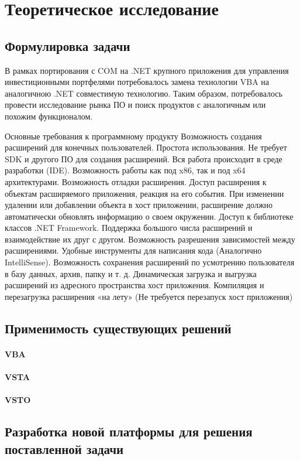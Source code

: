 \section{Теоретическое исследование}




\subsection{Формулировка задачи}

В рамках портирования с COM на .NET крупного приложения для управления инвестиционными портфелями потребовалось замена технологии VBA на аналогичною .NET совместимую технологию. Таким образом, потребовалось провести исследование рынка ПО и поиск продуктов с аналогичным или похожим функционалом.

Основные требования к программному продукту
Возможность создания расширений для конечных пользователей.
Простота использования.
Не требует SDK и другого ПО для создания расширений. Вся работа происходит в среде разработки (IDE).
Возможность работы как под x86, так и под x64 архитектурами.
Возможность отладки расширения.
Доступ расширения к объектам расширяемого приложения, реакция на его события.
При изменении удалении или добавлении объекта в хост приложении, расширение должно автоматически обновлять информацию о своем окружении.
Доступ к библиотеке классов .NET Framework.
Поддержка большого числа расширений и взаимодействие их друг с другом.
Возможность разрешения зависимостей между расширениями.
Удобные инструменты для написания кода (Аналогично IntelliSense).
Возможность сохранения расширений по усмотрению пользователя в базу данных, архив, папку и т. д.
Динамическая загрузка и выгрузка расширений из адресного пространства хост приложения.
Компиляция и перезагрузка расширения «на лету» (Не требуется перезапуск хост приложения)

\subsection{Применимость существующих решений}
\paragraph{VBA}
\paragraph{VSTA}
\paragraph{VSTO}
\subsection{Разработка новой платформы для решения поставленной задачи}

\pagebreak